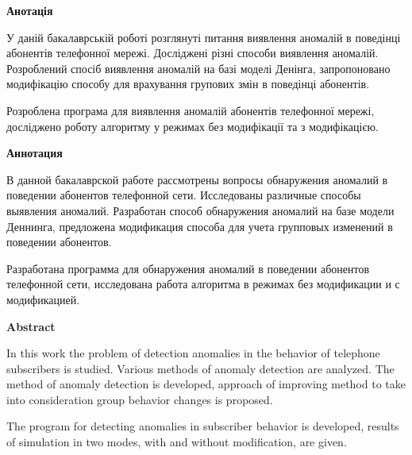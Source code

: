 
\newcommand{\abstracttile}[1]{%
\begingroup%
\centering\fontsize{18pt}{20pt}\selectfont\textbf{#1}\par%
\endgroup}

\thispagestyle{empty}
\abstracttile{Анотація}
У даній бакалаврській роботі розглянуті питання виявлення аномалій в поведінці абонентів телефонної мережі. Досліджені різні способи виявлення аномалій. Розроблений спосіб виявлення аномалій на базі моделі Денінга, запропоновано модифікацію способу для врахування групових змін в поведінці абонентів.

Розроблена програма для виявлення аномалій абонентів телефонної мережі, досліджено роботу алгоритму у режимах без модифікації та з модифікацією.

\abstracttile{Аннотация}
В данной бакалаврской работе рассмотрены вопросы обнаружения аномалий в поведении абонентов телефонной сети. Исследованы различные способы выявления аномалий. Разработан способ обнаружения аномалий на базе модели Деннинга, предложена модификация способа для учета групповых изменений в поведении абонентов.

Разработана программа для обнаружения аномалий в поведении абонентов телефонной сети, исследована работа алгоритма в режимах без модификации и с модификацией.

\abstracttile{Abstract}
In this work the problem of detection anomalies in the behavior of telephone subscribers is studied. Various methods of anomaly detection are analyzed. The method of anomaly detection is developed, approach of improving method to take into consideration group behavior changes is proposed.

The program for detecting anomalies in subscriber behavior is developed, results of simulation in two modes, with and without modification, are given.
